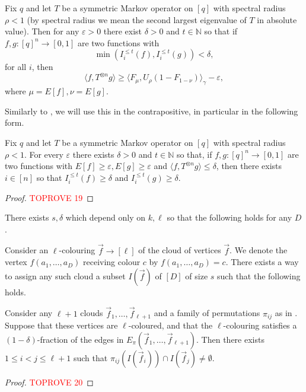 \documentclass[a4paper,11pt, DIV=11]{scrartcl}
\renewcommand{\epsilon}{\varepsilon}
\theoremstyle{plain}
\theoremstyle{definition}
\begin{document}
\begin{theorem}\label{thm:dinur_thm}
    Fix $q$ and let $T$ be a symmetric Markov operator on $[q]$ with spectral radius $\rho < 1$ (by spectral radius we mean the second largest eigenvalue of $T$ in absolute value). Then for any $\epsilon > 0$ there exist $\delta > 0$ and $t \in \mathbb{N}$ so that if $f, g : [q]^n \to [0, 1]$ are two functions with
    \[
    \min(I_i^{\leq t}(f), I_i^{\leq t}(g)) < \delta,
    \]
    for all $i$, then
    \[
    \langle f, T^{\otimes n} g\rangle \geq \langle F_\mu, U_\rho (1 - F_{1 - \nu})\rangle_\gamma - 
    \epsilon,
    \]
    where $\mu = E[f], \nu = E[g]$.
\end{theorem}

Similarly to \cite{Dinur09:sicomp}, we will use this in the contrapositive, in particular in the following form.

\begin{corollary}\label{cor:technical}
    Fix $q$ and let $T$ be a symmetric Markov operator on $[q]$ with spectral radius $\rho < 1$. For every $\epsilon$ there exists $\delta > 0$ and $t \in \mathbb{N}$ so that, if $f, g : [q]^n \to [0, 1]$ are two functions with $E[f] \geq \epsilon, E[g] \geq \epsilon$ and $\langle f, T^{\otimes n} g\rangle \leq \delta$, then there exists $i \in [n]$ so that $I_i^{\leq t}(f) \geq \delta$ and $I_i^{\leq t}(g) \geq \delta$.
\end{corollary}
\begin{proof}\textcolor{red}{TOPROVE 19}\end{proof}

\begin{lemma}\label{lem:technical}
    There exists $s, \delta$ which depend only on $k, \ell$ so that the following holds for any $D$.
    
    Consider an $\ell$-colouring $\vec{f} \to [\ell]$ of the cloud of vertices $\vec{f}$. We denote the vertex $f(a_1, \ldots, a_D)$ receiving colour $c$ by $f(a_1, \ldots, a_D) = c$. There exists a way to assign any such cloud a subset $I(\vec{f})$ of $[D]$ of size $s$ such that the following holds.

    Consider any $\ell + 1$ clouds $\vec{f}_1, \ldots, \vec{f}_{\ell + 1}$ and a family of permutations $\pi_{ij}$ as in . Suppose that these vertices are $\ell$-coloured, and that the $\ell$-colouring satisfies a $(1 - \delta)$-fraction of the edges in $E_\pi(\vec{f}_1, \ldots, \vec{f}_{\ell + 1})$. Then there exists $1 \leq i < j \leq \ell + 1$ such that $\pi_{ij}(I(\vec{f}_i)) \cap I(\vec{f}_j) \neq \emptyset$.
\end{lemma}
\begin{proof}\textcolor{red}{TOPROVE 20}\end{proof}
 
\end{document}
